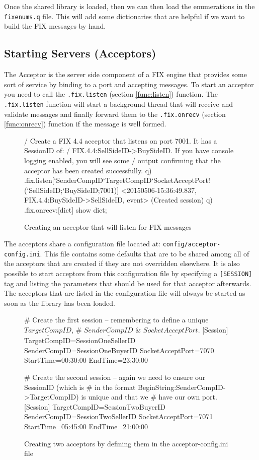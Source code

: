 Once the shared library is loaded, then we can then load the enumerations in the \verb|fixenums.q| file. This will add some dictionaries that are helpful if we want
to build the FIX messages by hand.

\subsection{Starting Servers (Acceptors)}

The Acceptor is the server side component of a FIX engine that provides some sort of service by binding to a port and accepting messages. To start an acceptor you need to
call the \texttt{.fix.listen} (section \ref{func:listen}) function. The \texttt{.fix.listen} function will start a background thread that will receive and validate messages and finally forward them to the \texttt{.fix.onrecv} (section \ref{func:onrecv}) function if the message is well formed.

\begin{figure}[H]
\begin{qcode}
/ Create a FIX 4.4 acceptor that listens on port 7001. It has a SessionID of:
/ FIX.4.4:SellSideID->BuySideID. If you have console logging enabled, you will see some
/ output confirming that the acceptor has been created successfully.
q) .fix.listen[`SenderCompID`TargetCompID`SocketAcceptPort!(`SellSideID;`BuySideID;7001)]
<20150506-15:36:49.837, FIX.4.4:BuySideID->SellSideID, event>
(Created session)
q) .fix.onrecv:{[dict] show dict; }
\end{qcode}
\caption{Creating an acceptor that will listen for FIX messages}
\end{figure}

The acceptors share a configuration file located at: \verb|config/acceptor-config.ini|. This file contains some defaults that are to be shared among all of the acceptors that are created if they are not overridden elsewhere. It is also possible to start acceptors from this configuration file by specifying a \verb|[SESSION]| tag and listing the parameters that should be used for that acceptor afterwards. The acceptors that are listed in the configuration file will always be started as soon as the library has been loaded.

\begin{figure}[H]
\begin{inicode}
# Create the first session -- remembering to define a unique $\underline{TargetCompID}$,
# $\underline{SenderCompID}$ & $\underline{SocketAcceptPort}$.
[Session]
TargetCompID=SessionOneSellerID
SenderCompID=SessionOneBuyerID
SocketAcceptPort=7070
StartTime=00:30:00
EndTime=23:30:00

# Create the second session -- again we need to ensure our SessionID (which is
# in the format BeginString:SenderCompID->TargetCompID) is unique and that we
# have our own port.
[Session]
TargetCompID=SessionTwoBuyerID
SenderCompID=SessionTwoSellerID
SocketAcceptPort=7071
StartTime=05:45:00
EndTime=21:00:00
\end{inicode}
\caption{Creating two acceptors by defining them in the acceptor-config.ini file}
\end{figure}

